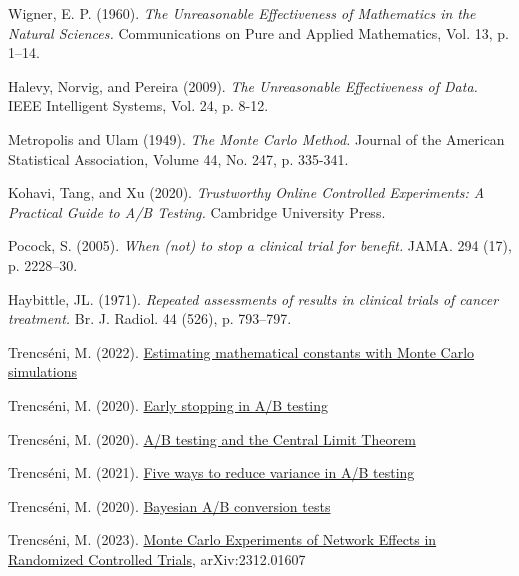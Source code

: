 \documentclass[final,5p,times,twocolumn,authoryear]{elsarticle}
\begin{document}
\begin{thebibliography}{00}

 Wigner, E. P. (1960). \textit{The Unreasonable Effectiveness of Mathematics in the Natural Sciences.} Communications on Pure and Applied Mathematics, Vol. 13, p. 1–14.

 Halevy, Norvig, and Pereira (2009). \textit{The Unreasonable Effectiveness of Data.} IEEE Intelligent Systems, Vol. 24, p. 8-12.

 Metropolis and Ulam (1949). \textit{The Monte Carlo Method.} Journal of the American Statistical Association, Volume 44, No. 247, p. 335-341.

 Kohavi, Tang, and Xu (2020). \textit{Trustworthy Online Controlled Experiments: A Practical Guide to A/B Testing.} Cambridge University Press.

 Pocock, S. (2005). \textit{When (not) to stop a clinical trial for benefit.} JAMA. 294 (17), p. 2228–30.

 Haybittle, JL. (1971). \textit{Repeated assessments of results in clinical trials of cancer treatment.} Br. J. Radiol. 44 (526), p. 793–797.

 Trencséni, M. (2022). \href{https://bytepawn.com/estimating-famous-mathematical-constants-with-monte-carlo-simulations.html}{Estimating mathematical constants with Monte Carlo simulations}

 Trencséni, M. (2020). \href{https://bytepawn.com/early-stopping-in-ab-testing.html}{Early stopping in A/B testing}

 Trencséni, M. (2020). \href{https://bytepawn.com/ab-testing-and-the-central-limit-theorem.html}{A/B testing and the Central Limit Theorem}

 Trencséni, M. (2021). \href{https://bytepawn.com/five-ways-to-reduce-variance-in-ab-testing.html}{Five ways to reduce variance in A/B testing}

 Trencséni, M. (2020). \href{https://bytepawn.com/bayesian-ab-conversion-tests.html}{Bayesian A/B conversion tests}

 Trencséni, M. (2023). \href{https://arxiv.org/abs/2312.01607}{Monte Carlo Experiments of Network Effects in Randomized Controlled Trials}, arXiv:2312.01607

\end{thebibliography}
\end{document}
